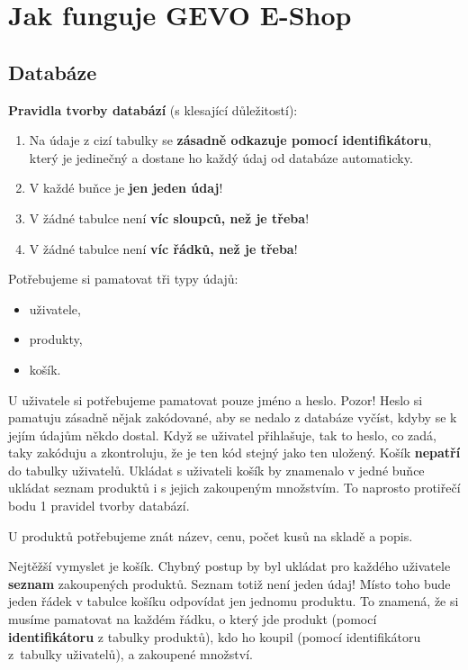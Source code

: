 \documentclass[a4paper,11pt]{article}
\begin{document}
\thispagestyle{fancy}

\section{Jak funguje GEVO E-Shop}
\label{sec:jak-funguje-e-shop}

\subsection{Databáze}
\label{ssec:databaze}

\textbf{Pravidla tvorby databází} (s klesající důležitostí):
\begin{enumerate}[topsep=0pt]
 \item Na údaje z cizí tabulky se \textbf{zásadně odkazuje pomocí
  identifikátoru}, který je jedinečný a dostane ho každý údaj od databáze
  automaticky.
 \item V každé buňce je \textbf{jen jeden údaj}!
 \item V žádné tabulce není \textbf{víc sloupců, než je třeba}!
 \item V žádné tabulce není \textbf{víc řádků, než je třeba}!
\end{enumerate}

Potřebujeme si pamatovat tři typy údajů:
\begin{itemize}[topsep=0pt]
 \item uživatele,
 \item produkty,
 \item košík.
\end{itemize}

U uživatele si potřebujeme pamatovat pouze jméno a heslo. Pozor! Heslo si
pamatuju zásadně nějak zakódované, aby se nedalo z databáze vyčíst, kdyby se k
jejím údajům někdo dostal. Když se uživatel přihlašuje, tak to heslo, co zadá,
taky zakóduju a zkontroluju, že je ten kód stejný jako ten uložený. Košík
\textbf{nepatří} do tabulky uživatelů. Ukládat s uživateli košík by znamenalo v
jedné buňce ukládat seznam produktů i s jejich za\-koupeným množstvím. To
naprosto protiřečí bodu 1 pravidel tvorby databází.

U produktů potřebujeme znát název, cenu, počet kusů na skladě a popis.

Nejtěžší vymyslet je košík. Chybný postup by byl ukládat pro každého uživatele
\textbf{seznam} za\-koupených produktů. Seznam totiž není jeden údaj! Místo toho
bude jeden řádek v tabulce košíku odpovídat jen jednomu produktu. To znamená, že
si musíme pamatovat na každém řádku, o který jde produkt (pomocí
\textbf{identifikátoru} z tabulky produktů), kdo ho koupil (pomocí
identifikátoru z~tabulky uživatelů), a zakoupené množství.
\end{document}
